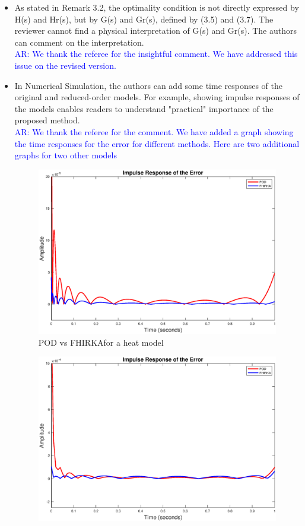 \documentclass[11pt]{article}
\newcommand{\FH}{FHIRKA}
\def\serkan#1{\textcolor{blue}{{#1}}}
\begin{document}
\begin{itemize}
\item As stated in Remark 3.2, the optimality condition is not directly
expressed by H(s) and Hr(s), but by G(s) and Gr(s), defined by (3.5)
and (3.7).  The reviewer cannot find a physical interpretation of G(s)
and Gr(s).  The authors can comment on the interpretation.\\
\serkan{\textsf{AR}:  We thank the referee for the insightful comment. We have addressed this issue on the revised version.}

\item In Numerical Simulation, the authors can add some time responses of
the original and reduced-order models.	For example, showing impulse
responses of the models enables readers to understand "practical"
importance of the proposed method.\\
\serkan{\textsf{AR}:  We thank the referee for the comment. We have added a graph showing the time responses for the error for different methods. Here are two additional graphs for two other models}
 \begin{figure}[H]
 \centering
   \includegraphics [scale=0.5]{absHeatErrorYlim}
      \caption{POD vs \FH for a heat model\label{fig:impulseHeat}}
 \end{figure}
 \begin{figure}[H]
 \centering
   \includegraphics [scale=0.5]{absUNSError}

\end{figure}
\end{itemize}
\end{document}
